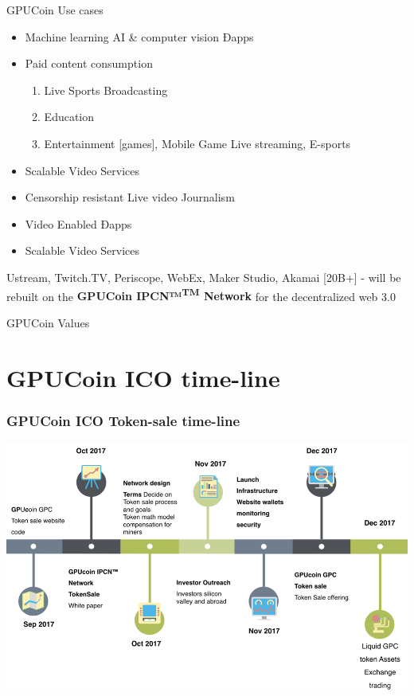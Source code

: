 \documentclass[10pt,handout]{beamer}
\begin{document}
\begin{frame}[fragile]{GPUCoin Use cases}
 \begin{itemize}[<+-| alert@+>]%
\item {Machine learning AI \& computer vision Ðapps} 
\item {Paid content consumption}
\begin{enumerate}[<+-| alert@+>]
\item Live Sports Broadcasting
\item Education 
\item Entertainment [games], Mobile Game Live streaming, E-sports
\end{enumerate}
\item {Scalable Video Services}
\item {Censorship resistant Live video Journalism}
\item {Video Enabled Ðapps}
\item {Scalable Video Services}

\end{itemize}
\pause

\Large{
Ustream, Twitch.TV, Periscope, WebEx, Maker Studio, Akamai [20B+] - will be rebuilt on the \textbf{GPUCoin IPCN™\textsuperscript{TM} Network} for the decentralized web 3.0
}

\end{frame}
\begin{frame}[t]{GPUCoin Values}

\end{frame}

\section{GPUCoin ICO time-line}
\begin{frame}[t]\frametitle{GPUCoin ICO Token-sale time-line}
 \includegraphics[width=1.0\textwidth]{static/gpc-tstimeline-trans}
\end{frame}
\end{document}
